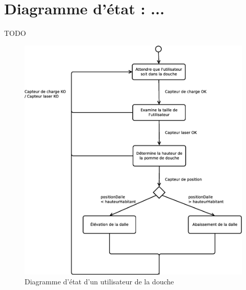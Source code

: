 \section{Diagramme d'état : ...}
TODO
\begin{figure}[H]
	\centering
	\includegraphics[width=1\linewidth]{diagrams/bathroom/diagramme_etat_st2.eps}
	\caption{Diagramme d'état d'un utilisateur de la douche}
	\label{fig:diagramme_st2}
\end{figure}

